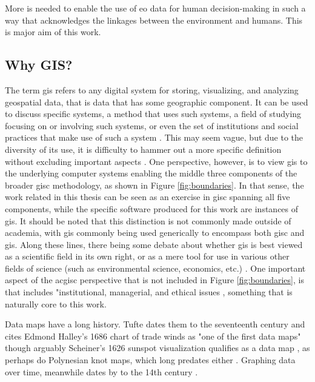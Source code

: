 More is needed to enable the use of \ac{eo} data for human decision-making in such a way that acknowledges the linkages between the environment and humans. This is major aim of this work. 

\subsection{Why GIS?} \label{sec:gis}

The term \ac{gis} refers to any digital system for storing, visualizing, and analyzing geospatial data, that is data that has some geographic component. It can be used to discuss specific systems, a method that uses such systems, a field of studying focusing on or involving such systems, or even the set of institutions and social practices that make use of such a system \cite{sheppardGISSocietyResearch1995}. This may seem vague, but due to the diversity of its use, it is difficulty to hammer out a more specific definition without excluding important aspects \cite{goodchildOverviewDefinitionGIS1992, picklesToolScienceGIS1997, chrismanWhatDoesGIS1999, heikkilaGISDeadLong1998}. One perspective, however, is to view \ac{gis} to the underlying computer systems enabling the middle three components of the broader \ac{gisc} methodology, as shown in Figure \ref{fig:boundaries}. In that sense, the work related in this thesis can be seen as an exercise in \ac{gisc} spanning all five components, while the specific software produced for this work are instances of \ac{gis}. It should be noted that this distinction is not commonly made outside of academia, with \ac{gis} commonly being used generically to encompass both \ac{gisc} and \ac{gis}. Along these lines, there being some debate about whether \ac{gis} is best viewed as a scientific field in its own right, or as a mere tool for use in various other fields of science (such as environmental science, economics, etc.) \cite{goodchildGeographicalInformationScience1992,goodchildTwentyYearsProgress2010}. One important aspect of the 
ac{gisc} perspective that is not included in Figure \ref{fig:boundaries}, is that includes "institutional, managerial, and ethical issues \cite{goodchildGeographicalInformationScience1992}, something that is naturally core to this work. 

Data maps have a long history. Tufte dates them to the seventeenth century and cites Edmond Halley's 1686 chart of trade winds as "one of the first data maps" \cite{tufteVisualDisplayQuantitative2001} though arguably Scheiner's 1626 sunspot visualization qualifies as a data map \cite{friendlyBriefHistoryData2008}, as perhaps do Polynesian knot maps, which long predates either \cite{davenportMarshallIslandsNavigational1960}. Graphing data over time, meanwhile dates by to the 14th century \cite{friendlyBriefHistoryData2008}.

